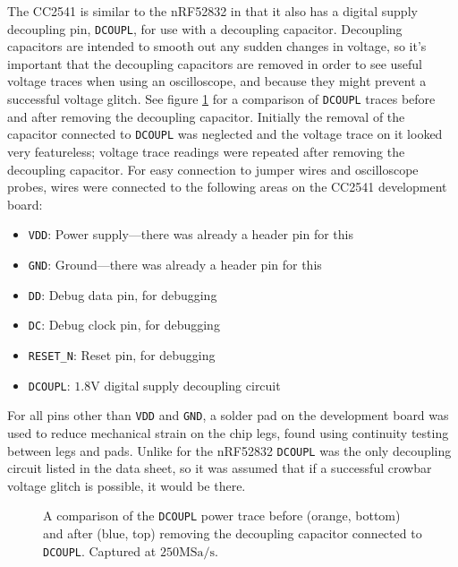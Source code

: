 The CC2541 is similar to the nRF52832 in that it also has a digital
supply decoupling pin, \texttt{DCOUPL}, for use with a decoupling
capacitor. Decoupling capacitors are intended to smooth out any sudden
changes in voltage, so it's important that the decoupling capacitors are
removed in order to see useful voltage traces when using an
oscilloscope, and because they might prevent a successful voltage
glitch. See figure \ref{img_cc2541_cap_comparison} for a comparison of
\texttt{DCOUPL} traces before and after removing the decoupling
capacitor. Initially the removal of the capacitor connected to
\texttt{DCOUPL} was neglected and the voltage trace on it looked very
featureless; voltage trace readings were repeated after removing the
decoupling capacitor. For easy connection to jumper wires and
oscilloscope probes, wires were connected to the following areas on the
CC2541 development board:

\begin{itemize}
\tightlist
\item
  \texttt{VDD}: Power supply---there was already a header pin for this
\item
  \texttt{GND}: Ground---there was already a header pin for this
\item
  \texttt{DD}: Debug data pin, for debugging
\item
  \texttt{DC}: Debug clock pin, for debugging
\item
  \texttt{RESET\_N}: Reset pin, for debugging
\item
  \texttt{DCOUPL}: \(1.8\si{\volt}\) digital supply decoupling circuit
\end{itemize}

For all pins other than \texttt{VDD} and \texttt{GND}, a solder pad on
the development board was used to reduce mechanical strain on the chip
legs, found using continuity testing between legs and pads. Unlike for
the nRF52832 \texttt{DCOUPL} was the only decoupling circuit listed in
the data sheet, so it was assumed that if a successful crowbar voltage
glitch is possible, it would be there.

\begin{figure}
  \begin{center}
    \scalebox{0.8}{}
  \end{center}
  \caption{A comparison of the \texttt{DCOUPL} power trace before (orange, bottom) and after (blue, top) removing the decoupling capacitor connected to \texttt{DCOUPL}. Captured at $250\textrm{MSa/s}$.\label{img_cc2541_cap_comparison}}
\end{figure}

